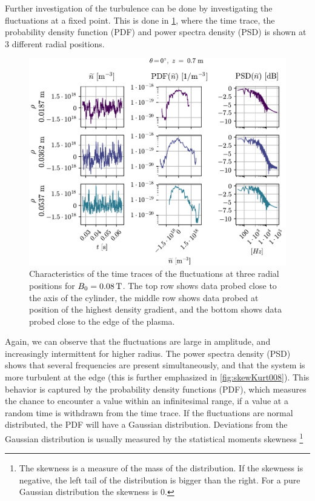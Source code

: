 Further investigation of the turbulence can be done by investigating the fluctuations at a fixed point.
This is done in \cref{fig:combinedPlots008}, where the time trace, the probability density function (PDF) and power spectra density (PSD) is shown at $3$ different radial positions.
%
\begin{figure}[htb]
    \centering
    \includegraphics{fig/results/combinedPlots/008T}
    \caption{Characteristics of the time traces of the fluctuations at three radial positions for $B_0=0.08\, \text{T}$.
        The top row shows data probed close to the axis of the cylinder,
        the middle row shows data probed at position of the highest density gradient,
        and the bottom shows data probed close to the edge of the plasma.
    }
    \label{fig:combinedPlots008}
\end{figure}
%
Again, we can observe that the fluctuations are large in amplitude, and increasingly intermittent for higher radius.
The power spectra density (PSD) shows that several frequencies are present simultaneously, and that the system is more turbulent at the edge (this is further emphasized in \cref{fig:skewKurt008}).
This behavior is captured by the probability density functions (PDF), which measures the chance to encounter a value within an infinitesimal range, if a value at a random time is withdrawn from the time trace.
If the fluctuations are normal distributed, the PDF will have a Gaussian distribution.
Deviations from the Gaussian distribution is usually measured by the statistical moments skewness%
%
\footnote{
    The skewness is a measure of the mass of the distribution.
    If the skewness is negative, the left tail of the distribution is bigger than the right.
    For a pure Gaussian distribution the skewness is 0.
}
